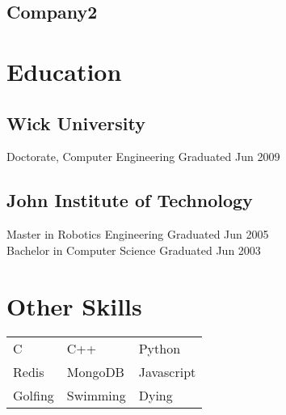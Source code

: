 \documentclass[11pt]{memoir}
\begin{document}
    \section{Company2}
      \textit{\lipsum[3][2]} %
      \lipsum[4][1-5]
    
  \chapter{Education}
    \section{Wick University}
      \begin{itshape}
        Doctorate, Computer Engineering \hfill Graduated Jun 2009
      \end{itshape}
    \section{John Institute of Technology}
      \begin{itshape}
        Master in Robotics Engineering \hfill Graduated Jun 2005\\
        Bachelor in Computer Science \hfill Graduated Jun 2003
      \end{itshape}

  \chapter{Other Skills}

    \centering
    \bfseries
    \begin{tabularx}{0.9\textwidth}{
    >{\raggedright\arraybackslash}X 
    >{\centering\arraybackslash}X 
    >{\raggedleft\arraybackslash}X}
      
      C & C++ & Python\\
      Redis & MongoDB & Javascript\\
      Golfing & Swimming & Dying\\
    \end{tabularx}
   
    
\end{document}
